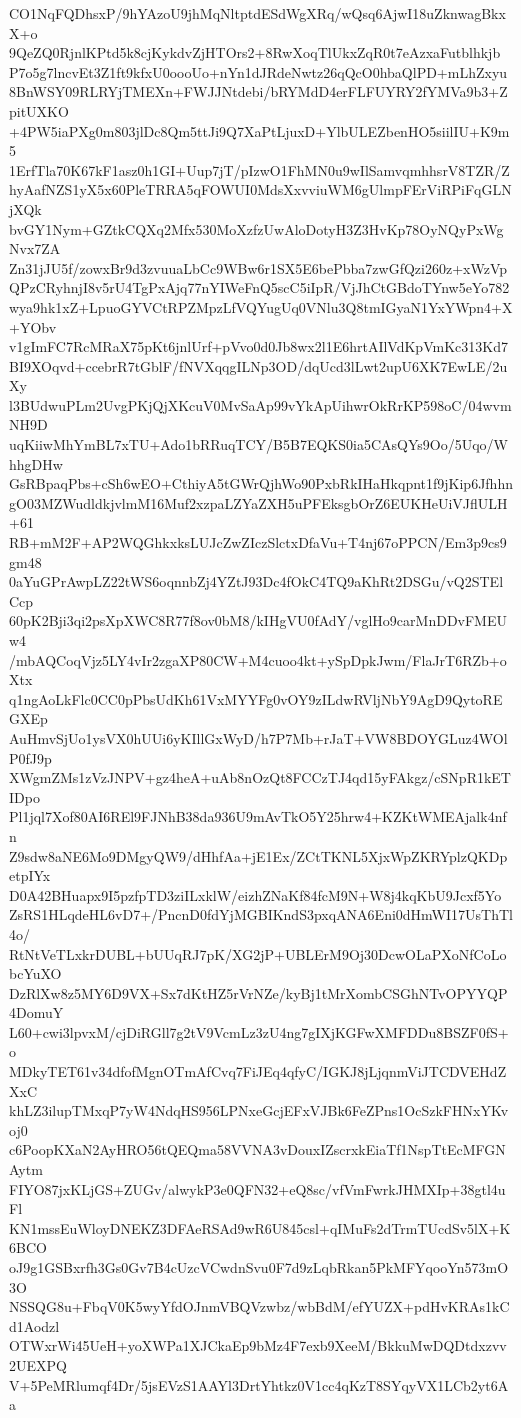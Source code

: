 CO1NqFQDhsxP/9hYAzoU9jhMqNltptdESdWgXRq/wQsq6AjwI18uZknwagBkxX+o
9QeZQ0RjnlKPtd5k8cjKykdvZjHTOrs2+8RwXoqTlUkxZqR0t7eAzxaFutblhkjb
P7o5g7lncvEt3Z1ft9kfxU0oooUo+nYn1dJRdeNwtz26qQcO0hbaQlPD+mLhZxyu
8BnWSY09RLRYjTMEXn+FWJJNtdebi/bRYMdD4erFLFUYRY2fYMVa9b3+ZpitUXKO
+4PW5iaPXg0m803jlDc8Qm5ttJi9Q7XaPtLjuxD+YlbULEZbenHO5siilIU+K9m5
1ErfTla70K67kF1asz0h1GI+Uup7jT/pIzwO1FhMN0u9wIlSamvqmhhsrV8TZR/Z
hyAafNZS1yX5x60PleTRRA5qFOWUI0MdsXxvviuWM6gUlmpFErViRPiFqGLNjXQk
bvGY1Nym+GZtkCQXq2Mfx530MoXzfzUwAloDotyH3Z3HvKp78OyNQyPxWgNvx7ZA
Zn31jJU5f/zowxBr9d3zvuuaLbCc9WBw6r1SX5E6bePbba7zwGfQzi260z+xWzVp
QPzCRyhnjI8v5rU4TgPxAjq77nYIWeFnQ5scC5iIpR/VjJhCtGBdoTYnw5eYo782
wya9hk1xZ+LpuoGYVCtRPZMpzLfVQYugUq0VNlu3Q8tmIGyaN1YxYWpn4+X+YObv
v1gImFC7RcMRaX75pKt6jnlUrf+pVvo0d0Jb8wx2l1E6hrtAIlVdKpVmKc313Kd7
BI9XOqvd+ccebrR7tGblF/fNVXqqgILNp3OD/dqUcd3lLwt2upU6XK7EwLE/2uXy
l3BUdwuPLm2UvgPKjQjXKcuV0MvSaAp99vYkApUihwrOkRrKP598oC/04wvmNH9D
uqKiiwMhYmBL7xTU+Ado1bRRuqTCY/B5B7EQKS0ia5CAsQYs9Oo/5Uqo/WhhgDHw
GsRBpaqPbs+cSh6wEO+CthiyA5tGWrQjhWo90PxbRkIHaHkqpnt1f9jKip6Jfhhn
gO03MZWudldkjvlmM16Muf2xzpaLZYaZXH5uPFEksgbOrZ6EUKHeUiVJflULH+61
RB+mM2F+AP2WQGhkxksLUJcZwZIczSlctxDfaVu+T4nj67oPPCN/Em3p9cs9gm48
0aYuGPrAwpLZ22tWS6oqnnbZj4YZtJ93Dc4fOkC4TQ9aKhRt2DSGu/vQ2STElCcp
60pK2Bji3qi2psXpXWC8R77f8ov0bM8/kIHgVU0fAdY/vglHo9carMnDDvFMEUw4
/mbAQCoqVjz5LY4vIr2zgaXP80CW+M4cuoo4kt+ySpDpkJwm/FlaJrT6RZb+oXtx
q1ngAoLkFlc0CC0pPbsUdKh61VxMYYFg0vOY9zILdwRVljNbY9AgD9QytoREGXEp
AuHmvSjUo1ysVX0hUUi6yKIllGxWyD/h7P7Mb+rJaT+VW8BDOYGLuz4WOlP0fJ9p
XWgmZMs1zVzJNPV+gz4heA+uAb8nOzQt8FCCzTJ4qd15yFAkgz/cSNpR1kETIDpo
Pl1jql7Xof80AI6REl9FJNhB38da936U9mAvTkO5Y25hrw4+KZKtWMEAjalk4nfn
Z9sdw8aNE6Mo9DMgyQW9/dHhfAa+jE1Ex/ZCtTKNL5XjxWpZKRYplzQKDpetpIYx
D0A42BHuapx9I5pzfpTD3ziILxklW/eizhZNaKf84fcM9N+W8j4kqKbU9Jcxf5Yo
ZsRS1HLqdeHL6vD7+/PncnD0fdYjMGBIKndS3pxqANA6Eni0dHmWI17UsThTl4o/
RtNtVeTLxkrDUBL+bUUqRJ7pK/XG2jP+UBLErM9Oj30DcwOLaPXoNfCoLobcYuXO
DzRlXw8z5MY6D9VX+Sx7dKtHZ5rVrNZe/kyBj1tMrXombCSGhNTvOPYYQP4DomuY
L60+cwi3lpvxM/cjDiRGll7g2tV9VcmLz3zU4ng7gIXjKGFwXMFDDu8BSZF0fS+o
MDkyTET61v34dfofMgnOTmAfCvq7FiJEq4qfyC/IGKJ8jLjqnmViJTCDVEHdZXxC
khLZ3ilupTMxqP7yW4NdqHS956LPNxeGcjEFxVJBk6FeZPns1OcSzkFHNxYKvoj0
c6PoopKXaN2AyHRO56tQEQma58VVNA3vDouxIZscrxkEiaTf1NspTtEcMFGNAytm
FIYO87jxKLjGS+ZUGv/alwykP3e0QFN32+eQ8sc/vfVmFwrkJHMXIp+38gtl4uFl
KN1mssEuWloyDNEKZ3DFAeRSAd9wR6U845csl+qIMuFs2dTrmTUcdSv5lX+K6BCO
oJ9g1GSBxrfh3Gs0Gv7B4cUzcVCwdnSvu0F7d9zLqbRkan5PkMFYqooYn573mO3O
NSSQG8u+FbqV0K5wyYfdOJnmVBQVzwbz/wbBdM/efYUZX+pdHvKRAs1kCd1Aodzl
OTWxrWi45UeH+yoXWPa1XJCkaEp9bMz4F7exb9XeeM/BkkuMwDQDtdxzvv2UEXPQ
V+5PeMRlumqf4Dr/5jsEVzS1AAYl3DrtYhtkz0V1cc4qKzT8SYqyVX1LCb2yt6Aa

